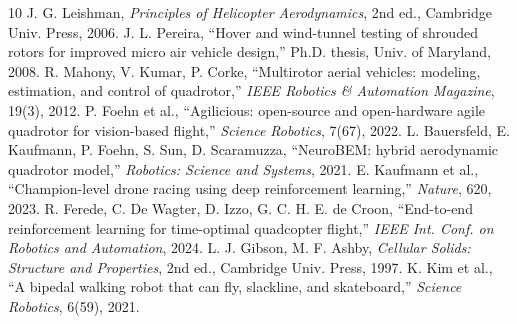 \documentclass[11pt]{article}
\begin{document}
\begin{thebibliography}{10}
 J. G. Leishman, \emph{Principles of Helicopter Aerodynamics}, 2nd ed., Cambridge Univ. Press, 2006.
 J. L. Pereira, ``Hover and wind-tunnel testing of shrouded rotors for improved micro air vehicle design,'' Ph.D. thesis, Univ. of Maryland, 2008.
 R. Mahony, V. Kumar, P. Corke, ``Multirotor aerial vehicles: modeling, estimation, and control of quadrotor,'' \emph{IEEE Robotics \& Automation Magazine}, 19(3), 2012.
 P. Foehn et al., ``Agilicious: open-source and open-hardware agile quadrotor for vision-based flight,'' \emph{Science Robotics}, 7(67), 2022.
 L. Bauersfeld, E. Kaufmann, P. Foehn, S. Sun, D. Scaramuzza, ``NeuroBEM: hybrid aerodynamic quadrotor model,'' \emph{Robotics: Science and Systems}, 2021.
 E. Kaufmann et al., ``Champion-level drone racing using deep reinforcement learning,'' \emph{Nature}, 620, 2023.
 R. Ferede, C. De Wagter, D. Izzo, G. C. H. E. de Croon, ``End-to-end reinforcement learning for time-optimal quadcopter flight,'' \emph{IEEE Int. Conf. on Robotics and Automation}, 2024.
 L. J. Gibson, M. F. Ashby, \emph{Cellular Solids: Structure and Properties}, 2nd ed., Cambridge Univ. Press, 1997.
 K. Kim et al., ``A bipedal walking robot that can fly, slackline, and skateboard,'' \emph{Science Robotics}, 6(59), 2021.
\end{thebibliography}
\end{document}
